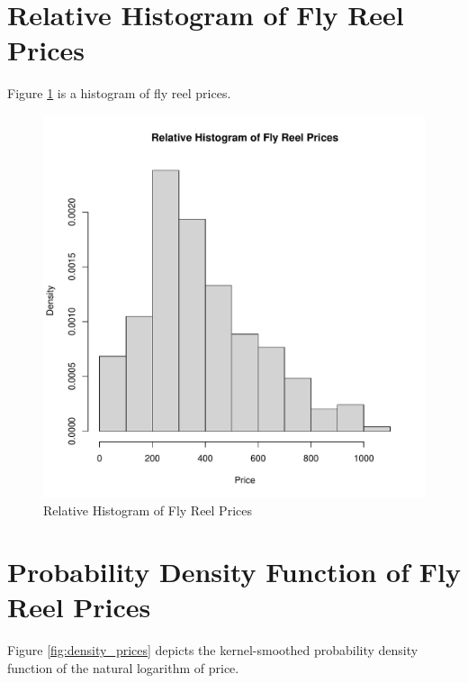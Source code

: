 \section{Relative Histogram of Fly Reel Prices}

Figure \ref{fig:hist_prices} is 
a histogram of fly reel prices. 

\begin{figure}[h!]
  \centering
  \includegraphics[scale = 0.5, keepaspectratio=true]{../Figures/hist_prices}
  \caption{Relative Histogram of Fly Reel Prices} \label{fig:hist_prices}
\end{figure}


\pagebreak
\section{Probability Density Function of Fly Reel Prices}

Figure \ref{fig:density_prices} depicts 
the kernel-smoothed probability density function of the natural logarithm of
price.

